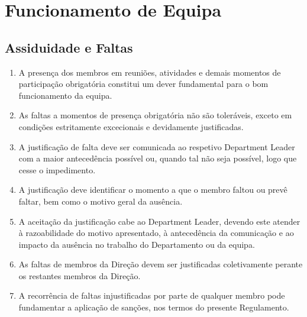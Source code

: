 \chapter{Funcionamento de Equipa}

\section{Assiduidade e Faltas}
\begin{enumerate}
  \item A presença dos membros em reuniões, atividades e demais momentos de participação obrigatória constitui um dever fundamental para o bom funcionamento da equipa.
  \item As faltas a momentos de presença obrigatória não são toleráveis, exceto em condições estritamente excecionais e devidamente justificadas.
  \item A justificação de falta deve ser comunicada ao respetivo Department Leader com a maior antecedência possível ou, quando tal não seja possível, logo que cesse o impedimento.
  \item A justificação deve identificar o momento a que o membro faltou ou prevê faltar, bem como o motivo geral da ausência.
  \item A aceitação da justificação cabe ao Department Leader, devendo este atender à razoabilidade do motivo apresentado, à antecedência da comunicação e ao impacto da ausência no trabalho do Departamento ou da equipa.
  \item As faltas de membros da Direção devem ser justificadas coletivamente perante os restantes membros da Direção.
  \item A recorrência de faltas injustificadas por parte de qualquer membro pode fundamentar a aplicação de sanções, nos termos do presente Regulamento.
\end{enumerate}

